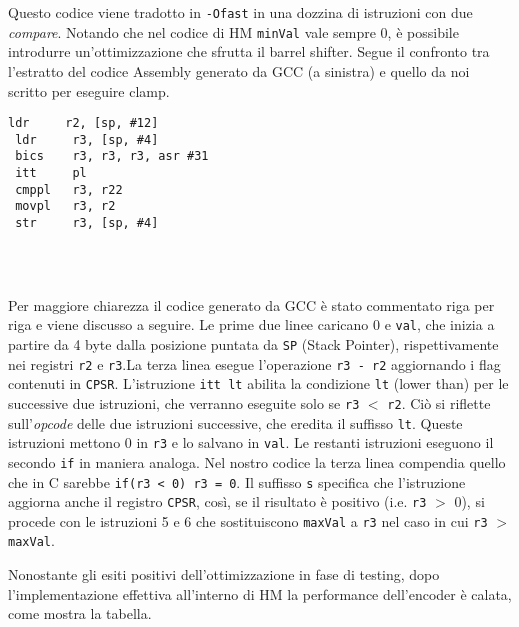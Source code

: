 Questo codice viene tradotto in \verb|-Ofast| in una dozzina di istruzioni con 
due \emph{compare}. Notando che nel codice di HM \verb|minVal| vale sempre 0, è 
possibile introdurre un'ottimizzazione che sfrutta il barrel shifter. \newline
Segue il confronto tra l'estratto del codice Assembly generato da GCC (a 
sinistra) e quello da noi scritto per eseguire clamp.\\

%    

\begin{minipage}{.565\textwidth}
  
\end{minipage}
\hfill
\begin{minipage}{.435\textwidth}
 \begin{lstlisting}[stepnumber=0, frame=ltb]
 ldr     r2, [sp, #12]
 ldr     r3, [sp, #4]
 bics    r3, r3, r3, asr #31
 itt     pl
 cmppl   r3, r22
 movpl   r3, r2
 str     r3, [sp, #4]




 \end{lstlisting}
\end{minipage}
Per maggiore chiarezza il codice generato da GCC è stato commentato riga per 
riga e viene discusso a seguire. \newline
Le prime due linee caricano 0 e \verb|val|, che inizia a partire da 4 byte 
dalla posizione puntata da \verb|SP| (Stack Pointer), rispettivamente nei 
registri \verb|r2| e \verb|r3|.\newline La terza linea esegue l'operazione 
\verb|r3 - r2| aggiornando i flag contenuti in \verb|CPSR|.\newline 
L'istruzione \verb|itt lt| abilita la condizione 
\verb|lt| (lower than) per le successive due istruzioni, che verranno  
eseguite solo se \verb|r3| $<$ \verb|r2|. Ciò si riflette sull'\emph{opcode}
delle due istruzioni successive, che eredita il suffisso \verb|lt|. Queste 
istruzioni mettono 0 in \verb|r3| e lo salvano in \verb|val|. \newline
Le restanti istruzioni eseguono il secondo \verb|if| in maniera analoga.\newline
Nel nostro codice la terza linea compendia quello che in C sarebbe 
\verb|if(r3 < 0) r3 = 0|. Il suffisso \verb|s| specifica che l'istruzione 
aggiorna anche il registro \verb|CPSR|, così, se il risultato è positivo (i.e. 
\verb|r3| $>$ 0), si procede con le istruzioni 5 e 6 che sostituiscono 
\verb|maxVal| a \verb|r3| nel caso in cui \verb|r3| $>$ \verb|maxVal|.
\par Nonostante gli esiti positivi dell'ottimizzazione in fase di testing, dopo 
l'implementazione effettiva all'interno di HM la performance dell'encoder è 
calata, come mostra la tabella.

